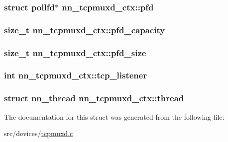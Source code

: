 \subsubsection[{pfd}]{\setlength{\rightskip}{0pt plus 5cm}struct pollfd$\ast$ nn\+\_\+tcpmuxd\+\_\+ctx\+::pfd}\hypertarget{structnn__tcpmuxd__ctx_ae561c5e942bb5d994f932164a001cac0}{}\label{structnn__tcpmuxd__ctx_ae561c5e942bb5d994f932164a001cac0}
\subsubsection[{pfd\+\_\+capacity}]{\setlength{\rightskip}{0pt plus 5cm}size\+\_\+t nn\+\_\+tcpmuxd\+\_\+ctx\+::pfd\+\_\+capacity}\hypertarget{structnn__tcpmuxd__ctx_a5a5fb79c99e503b6b8acf8cff8ece82b}{}\label{structnn__tcpmuxd__ctx_a5a5fb79c99e503b6b8acf8cff8ece82b}
\subsubsection[{pfd\+\_\+size}]{\setlength{\rightskip}{0pt plus 5cm}size\+\_\+t nn\+\_\+tcpmuxd\+\_\+ctx\+::pfd\+\_\+size}\hypertarget{structnn__tcpmuxd__ctx_a030af965b1ecc68131d5b23df5ccd705}{}\label{structnn__tcpmuxd__ctx_a030af965b1ecc68131d5b23df5ccd705}
\subsubsection[{tcp\+\_\+listener}]{\setlength{\rightskip}{0pt plus 5cm}int nn\+\_\+tcpmuxd\+\_\+ctx\+::tcp\+\_\+listener}\hypertarget{structnn__tcpmuxd__ctx_a9a748562695c46e091f4179545f49a0c}{}\label{structnn__tcpmuxd__ctx_a9a748562695c46e091f4179545f49a0c}
\subsubsection[{thread}]{\setlength{\rightskip}{0pt plus 5cm}struct {\bf nn\+\_\+thread} nn\+\_\+tcpmuxd\+\_\+ctx\+::thread}\hypertarget{structnn__tcpmuxd__ctx_a0f353434edac1a6057af1b50905447be}{}\label{structnn__tcpmuxd__ctx_a0f353434edac1a6057af1b50905447be}


The documentation for this struct was generated from the following file\+:\begin{DoxyCompactItemize}
\item 
src/devices/\hyperlink{tcpmuxd_8c}{tcpmuxd.\+c}\end{DoxyCompactItemize}
